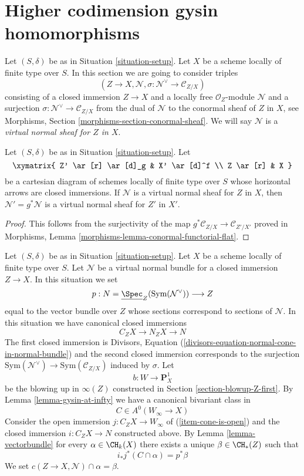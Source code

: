\section{Higher codimension gysin homomorphisms}
\label{section-gysin-higher-codimension}

\noindent
Let $(S, \delta)$ be as in Situation \ref{situation-setup}. Let $X$ be a scheme
locally of finite type over $S$. In this section we are going to consider
triples
$$
(Z \to X, \mathcal{N}, \sigma : \mathcal{N}^\vee \to \mathcal{C}_{Z/X})
$$
consisting of a closed immersion $Z \to X$ and a locally free
$\mathcal{O}_Z$-module $\mathcal{N}$ and a surjection
$\sigma : \mathcal{N}^\vee \to \mathcal{C}_{Z/X}$ from the dual
of $\mathcal{N}$ to the conormal sheaf of $Z$ in $X$, see
Morphisms, Section \ref{morphisms-section-conormal-sheaf}.
We will say
$\mathcal{N}$ is a {\it virtual normal sheaf for $Z$ in $X$}.

\begin{lemma}
\label{lemma-pullback-virtual-normal-sheaf}
Let $(S, \delta)$ be as in Situation \ref{situation-setup}. Let
$$
\xymatrix{
Z' \ar[r] \ar[d]_g & X' \ar[d]^f \\
Z \ar[r] & X
}
$$
be a cartesian diagram of schemes locally of finite type over $S$
whose horizontal arrows are closed immersions.
If $\mathcal{N}$ is a virtual normal sheaf for $Z$ in $X$, then
$\mathcal{N}' = g^*\mathcal{N}$ is a virtual normal sheaf for
$Z'$ in $X'$.
\end{lemma}

\begin{proof}
This follows from the surjectivity of the map
$g^*\mathcal{C}_{Z/X} \to \mathcal{C}_{Z'/X'}$ proved in
Morphisms, Lemma \ref{morphisms-lemma-conormal-functorial-flat}.
\end{proof}

\noindent
Let $(S, \delta)$ be as in Situation \ref{situation-setup}. Let $X$ be a scheme
locally of finite type over $S$. Let $\mathcal{N}$ be a virtual normal bundle
for a closed immersion $Z \to X$. In this situation we set
$$
p : N = \underline{\Spec}_Z(\text{Sym}(\mathcal{N}^\vee)) \longrightarrow Z
$$
equal to the vector bundle over $Z$
whose sections correspond to sections of $\mathcal{N}$.
In this situation we have canonical closed immersions
$$
C_ZX \longrightarrow N_ZX \longrightarrow N
$$
The first closed immersion is Divisors, Equation
(\ref{divisors-equation-normal-cone-in-normal-bundle})
and the second closed immersion corresponds to the surjection
$\text{Sym}(\mathcal{N}^\vee) \to \text{Sym}(\mathcal{C}_{Z/X})$
induced by $\sigma$.
Let
$$
b : W \longrightarrow \mathbf{P}^1_X
$$
be the blowing up in $\infty(Z)$ constructed in
Section \ref{section-blowup-Z-first}. By
Lemma \ref{lemma-gysin-at-infty}
we have a canonical bivariant class in
$$
C \in A^0(W_\infty \to X)
$$
Consider the open immersion $j : C_ZX \to W_\infty$ of
(\ref{item-cone-is-open}) and the closed immersion
$i : C_ZX \to N$ constructed above. By Lemma \ref{lemma-vectorbundle}
for every $\alpha \in \CH_k(X)$ there exists a unique
$\beta \in \CH_*(Z)$ such that
$$
i_*j^*(C \cap \alpha) = p^*\beta
$$
We set $c(Z \to X, \mathcal{N}) \cap \alpha = \beta$.


